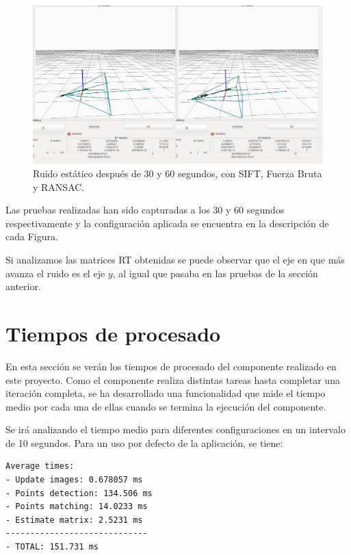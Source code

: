 \begin{figure}[th]
\centering
\includegraphics[scale=0.3]{Figures/tests/static-ransac_2.png}
\decoRule
\caption[Ruido estático, con SIFT, Fuerza Bruta y RANSAC]{Ruido estático después de 30 y 60 segundos, con SIFT, Fuerza Bruta y RANSAC.}
\label{fig:static3}
\end{figure}

Las pruebas realizadas han sido capturadas a los 30 y 60 segundos respectivamente y la configuración aplicada se encuentra en la descripción de cada Figura.

Si analizamos las matrices RT obtenidas se puede observar que el eje en que más avanza el ruido es el eje $y$, al igual que pasaba en las pruebas de la sección anterior.


\newpage
\section{Tiempos de procesado}
En esta sección se verán los tiempos de procesado del componente realizado en este proyecto. Como el componente realiza distintas tareas hasta completar una iteración completa, se ha desarrollado una funcionalidad que mide el tiempo medio por cada una de ellas cuando se termina la ejecución del componente.

Se irá analizando el tiempo medio para diferentes configuraciones en un intervalo de 10 segundos. Para un uso por defecto de la aplicación, se tiene:

\begin{lstlisting}[style=CStyle]
Average times:
- Update images: 0.678057 ms
- Points detection: 134.506 ms
- Points matching: 14.0233 ms
- Estimate matrix: 2.5231 ms
-----------------------------
- TOTAL: 151.731 ms
\end{lstlisting}

